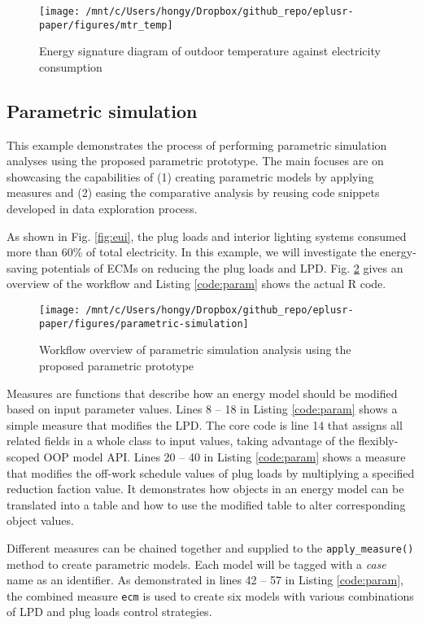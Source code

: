 \documentclass[3p, times]{elsarticle} %
\begin{document}
\begin{figure}[!htb]
\texttt{[image: /mnt/c/Users/hongy/Dropbox/github\_repo/eplusr-paper/figures/mtr\_temp]} \caption{Energy signature diagram of outdoor temperature against electricity consumption}\label{fig:signature}
\end{figure}

\hypertarget{sec:param}{%
\subsection{Parametric simulation}\label{sec:param}}

This example demonstrates the process of performing parametric simulation
analyses using the proposed parametric prototype.
The main focuses are on showcasing the capabilities of (1) creating parametric
models by applying measures and (2) easing the comparative analysis by reusing
code snippets developed in data exploration process.

As shown in Fig. \ref{fig:eui}, the plug loads and interior lighting systems
consumed more than 60\% of total electricity.
In this example, we will investigate the energy-saving potentials of ECMs on
reducing the plug loads and LPD.
Fig. \ref{fig:flow-param} gives an overview of the workflow and Listing
\ref{code:param} shows the actual R code.

\begin{figure}[!htb]
\texttt{[image: /mnt/c/Users/hongy/Dropbox/github\_repo/eplusr-paper/figures/parametric-simulation]} \caption{Workflow overview of parametric simulation analysis using the proposed parametric prototype}\label{fig:flow-param}
\end{figure}

Measures are functions that describe how an energy model should be modified
based on input parameter values.
Lines 8 -- 18 in Listing \ref{code:param} shows a simple measure that modifies
the LPD.
The core code is line 14 that assigns all related fields in a whole class to
input values, taking advantage of the flexibly-scoped OOP model API.
Lines 20 -- 40 in Listing \ref{code:param} shows a measure that modifies the off-work
schedule values of plug loads by multiplying a specified reduction faction
value.
It demonstrates how objects in an energy model can be
translated into a table and how to use the modified table to alter
corresponding object values.

Different measures can be chained together and supplied to the
\texttt{apply\_measure()} method to create parametric models.
Each model will be tagged with a \emph{case} name as an identifier.
As demonstrated in lines 42 -- 57 in Listing \ref{code:param}, the
combined measure \texttt{ecm} is used to create six models with various combinations
of LPD and plug loads control strategies.
\end{document}

